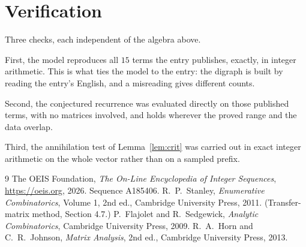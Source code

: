 \documentclass[11pt,a4paper]{article}
\theoremstyle{plain}
\theoremstyle{definition}
\begin{document}
\section{Verification}

Three checks, each independent of the algebra above.

First, the model reproduces all $15$ terms the entry publishes, exactly, in integer
arithmetic. This is what ties the model to the entry: the digraph is built by reading the
entry's English, and a misreading gives different counts.

Second, the conjectured recurrence was evaluated directly on those published terms, with no
matrices involved, and holds wherever the proved range and the data overlap.

Third, the annihilation test of Lemma~\ref{lem:crit} was carried out in exact integer
arithmetic on the whole vector rather than on a sampled prefix.

\begin{thebibliography}{9}
 The OEIS Foundation, \emph{The On-Line Encyclopedia of Integer
Sequences}, \url{https://oeis.org}, 2026. Sequence A185406.
 R.~P.~Stanley, \emph{Enumerative Combinatorics}, Volume 1, 2nd ed.,
Cambridge University Press, 2011. (Transfer-matrix method, Section 4.7.)
 P.~Flajolet and R.~Sedgewick, \emph{Analytic Combinatorics}, Cambridge
University Press, 2009.
 R.~A.~Horn and C.~R.~Johnson, \emph{Matrix Analysis}, 2nd ed., Cambridge
University Press, 2013.
\end{thebibliography}
\end{document}
